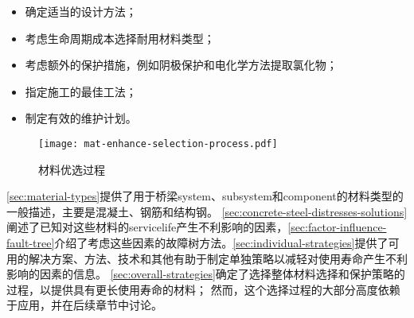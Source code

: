 \begin{itemize}
  \item 确定适当的设计方法；
  \item 考虑生命周期成本选择耐用材料类型；
  \item 考虑额外的保护措施，例如阴极保护和电化学方法提取氯化物；
  \item 指定施工的最佳工法；
  \item 制定有效的维护计划。
\end{itemize}

\begin{figure}
  \texttt{[image: mat-enhance-selection-process.pdf]}
  \caption{材料优选过程}\label{fig:mat-enhance-selection-process}
\end{figure}

\cref{sec:material-types}提供了用于桥梁\gls*{system}、\gls*{subsystem}和\gls*{component}的材料类型的一般描述，主要是混凝土、钢筋和结构钢。 \cref{sec:concrete-steel-distresses-solutions}阐述了已知对这些材料的\gls*{servicelife}产生不利影响的因素，\cref{sec:factor-influence-fault-tree}介绍了考虑这些因素的{故障树}方法。\cref{sec:individual-strategies}提供了可用的解决方案、方法、技术和其他有助于制定单独策略以减轻对使用寿命产生不利影响的因素的信息。 \cref{sec:overall-strategies}确定了选择整体材料选择和保护策略的过程，以提供具有更长使用寿命的材料； 然而，这个选择过程的大部分高度依赖于应用，并在后续章节中讨论。

